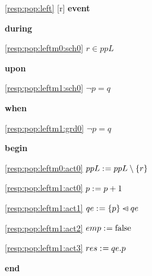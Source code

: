\noindent \ref{resp:pop:left} [r] \textbf{event}
\begin{block}
  \item   \textbf{during}
  \begin{block}
  \item[ \eqref{resp:pop:leftm0:sch0} ]{$r \in ppL $} %
  \end{block}
  \item   \textbf{upon}
  \begin{block}
  \item[ \eqref{resp:pop:leftm1:sch0} ]{$\neg p = q$} %
  \end{block}
  \item   \textbf{when}
  \begin{block}
  \item[ \eqref{resp:pop:leftm1:grd0} ]{$\neg p = q$} %
  \end{block}
  \item   \textbf{begin}
  \begin{block}
  \item[ \eqref{resp:pop:leftm0:act0} ]{$ppL \mathrel{:\mkern1mu=} ppL \setminus \{ r \} $} %
  \item[ \eqref{resp:pop:leftm1:act0} ]{$p \mathrel{:\mkern1mu=} p+1$} %
  \item[ \eqref{resp:pop:leftm1:act1} ]{$qe \mathrel{:\mkern1mu=} \{ p \} \mathbin{\lhd\mkern-14mu-} qe $} %
  \item[ \eqref{resp:pop:leftm1:act2} ]{$emp \mathrel{:\mkern1mu=} \text{false} $} %
  \item[ \eqref{resp:pop:leftm1:act3} ]{$res \mathrel{:\mkern1mu=} qe.p $} %
  \end{block}
  \item   \textbf{end} \\
\end{block}
